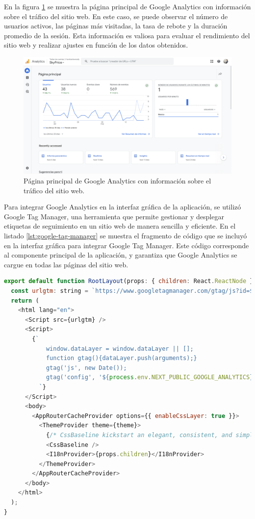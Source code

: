 En la figura \ref{fig:google-analytics} se muestra la página principal de Google
Analytics con información sobre el tráfico del sitio web. En este caso, se puede
observar el número de usuarios activos, las páginas más visitadas, la tasa de rebote
y la duración promedio de la sesión. Esta información es valiosa para evaluar el
rendimiento del sitio web y realizar ajustes en función de los datos obtenidos.

\begin{figure}[H]
    \centering
    \includegraphics[width=1.0\textwidth]{imagenes/05-implementacion/pruebas/analytics-main.png}
    \caption{Página principal de Google Analytics con información sobre el tráfico del sitio web.}
    \label{fig:google-analytics}
\end{figure}

Para integrar Google Analytics en la interfaz gráfica de la aplicación, se utilizó
Google Tag Manager, una herramienta que permite gestionar y desplegar etiquetas de
seguimiento en un sitio web de manera sencilla y eficiente. En el listado
\ref{lst:google-tag-manager} se muestra el fragmento de código que se incluyó en
la interfaz gráfica para integrar Google Tag Manager. Este código corresponde
al componente principal de la aplicación, y garantiza que Google Analytics se
cargue en todas las páginas del sitio web.

\begin{lstlisting}[language=javascript, caption={Fragmento de código para Google Tag Manager}, label={lst:google-tag-manager}]
export default function RootLayout(props: { children: React.ReactNode }) {
  const urlgtm: string = `https://www.googletagmanager.com/gtag/js?id=${process.env.NEXT_PUBLIC_GOOGLE_ANALYTICS}`;
  return (
    <html lang="en">
      <Script src={urlgtm} />
      <Script>
        {`
            window.dataLayer = window.dataLayer || [];
            function gtag(){dataLayer.push(arguments);}
            gtag('js', new Date());
            gtag('config', '${process.env.NEXT_PUBLIC_GOOGLE_ANALYTICS}');
          `}
      </Script>
      <body>
        <AppRouterCacheProvider options={{ enableCssLayer: true }}>
          <ThemeProvider theme={theme}>
            {/* CssBaseline kickstart an elegant, consistent, and simple baseline to build upon. */}
            <CssBaseline />
            <I18nProvider>{props.children}</I18nProvider>
          </ThemeProvider>
        </AppRouterCacheProvider>
      </body>
    </html>
  );
}
\end{lstlisting}

